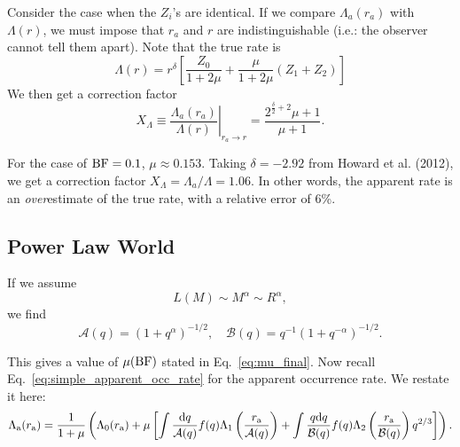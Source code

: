 \documentclass[12pt,modern]{aastex61}
\begin{document}
Consider the case when the $Z_i$'s are identical. If we compare 
$\Lambda_a(r_a)$ with $\Lambda(r)$, we must impose that $r_a$ and $r$ are 
indistinguishable (i.e.: the observer cannot tell them apart).
Note that the true rate is
\begin{equation}
\Lambda(r) = r^\delta \left[
\frac{Z_0}{1+2\mu} + \frac{\mu}{1+2\mu} (Z_1+Z_2)
\right]
\end{equation}
We then get a correction factor
\begin{equation}
X_\Lambda \equiv \left. \frac{\Lambda_a(r_a)}{\Lambda(r)} 
\right|_{r_a\rightarrow r}
=
\frac{2^{\frac{\delta}{2}+2}\mu + 1}{\mu + 1}.
\end{equation}

For the case of ${\rm BF}=0.1$, $\mu\approx 0.153$. Taking $\delta=-2.92$ from 
Howard et al. (2012),  we get a correction factor $X_\Lambda = 
\Lambda_a/\Lambda = 1.06$.
In other words, the apparent rate is an {\it over}estimate of the true rate, 
with a relative error of 6\%.

\subsection{Power Law World}

If we assume 
\begin{equation}
	L(M) \sim M^\alpha \sim R^\alpha,
\end{equation}
we find 
\begin{equation}
\mathcal{A}(q)
=(1+q^\alpha)^{-1/2},
\quad
\mathcal{B}(q)
=q^{-1}(1+q^{-\alpha})^{-1/2}.
\end{equation}

This gives a value of $\mu({\rm BF})$ stated in Eq.~\ref{eq:mu_final}.
Now recall Eq.~\ref{eq:simple_apparent_occ_rate} for the apparent occurrence 
rate. We restate it here:
\begin{equation}
\Lambda\a(r\a) = \frac{1}{1+\mu}
\left(
\Lambda_0(r\a) +
\mu \left[
\int \frac{{\rm d}q}{\mathcal{A}(q)} f(q) 
\Lambda_1\left( \frac{r\a}{\mathcal{A}(q)} \right)
+
\int \frac{q {\rm d}q}{\mathcal{B}(q)} f(q)
\Lambda_2\left(\frac{r\a}{\mathcal{B}(q)}\right) q^{2/3}
\right]
\right).
\end{equation}
\end{document}
